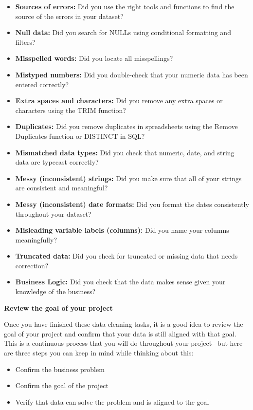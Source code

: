 \documentclass[]{article}
\begin{document}
\begin{itemize}
  \item \textbf{Sources of errors:} Did you use the right tools and functions to find the source of the errors in your dataset?
  \item \textbf{Null data:} Did you search for NULLs using conditional formatting and filters?
  \item \textbf{Misspelled words:} Did you locate all misspellings?
  \item \textbf{Mistyped numbers:} Did you double-check that your numeric data has been entered correctly?
  \item \textbf{Extra spaces and characters:} Did you remove any extra spaces or characters using the TRIM function?
  \item \textbf{Duplicates:} Did you remove duplicates in spreadsheets using the Remove Duplicates function or DISTINCT in SQL?
  \item \textbf{Mismatched data types:} Did you check that numeric, date, and string data are typecast correctly?
  \item \textbf{Messy (inconsistent) strings:} Did you make sure that all of your strings are consistent and meaningful?
  \item \textbf{Messy (inconsistent) date formats:} Did you format the dates consistently throughout your dataset?
  \item \textbf{Misleading variable labels (columns):} Did you name your columns meaningfully?
  \item \textbf{Truncated data:} Did you check for truncated or missing data that needs correction?
  \item \textbf{Business Logic:} Did you check that the data makes sense given your knowledge of the business?
\end{itemize}

\textbf{Review the goal of your project}

Once you have finished these data cleaning tasks, it is a good idea to review the goal of your project and confirm that your data is still aligned with that goal. This is a continuous process that you will do throughout your project-- but here are three steps you can keep in mind while thinking about this:

\begin{itemize}
  \item Confirm the business problem
  \item Confirm the goal of the project
  \item Verify that data can solve the problem and is aligned to the goal
\end{itemize}
\end{document}
